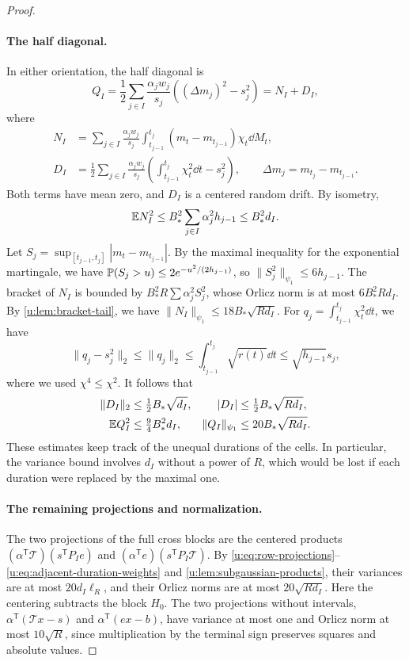\begin{proof}
\paragraph{The half diagonal.}
In either orientation, the half diagonal is
\begin{equation}\label{u:eq:half-diagonal}
 Q_I=\frac12\sum_{j\in I}\frac{\alpha_jw_j}{s_j}
       ((\Delta m_j)^2-s_j^2)=N_I+D_I,
\end{equation}
where
\[
\begin{aligned}
 N_I&=\sum_{j\in I}\frac{\alpha_jw_j}{s_j}
 \int_{t_{j-1}}^{t_j}(m_t-m_{t_{j-1}})\chi_t\dd M_t,\\
 D_I&=\frac12\sum_{j\in I}\frac{\alpha_jw_j}{s_j}
 \left(\int_{t_{j-1}}^{t_j}\chi_t^2\dd t-s_j^2\right),
 \qquad \Delta m_j=m_{t_j}-m_{t_{j-1}}.
\end{aligned}
\]
Both terms have mean zero, and $D_I$ is a centered random drift.
By isometry,
\[
 \mathbb E N_I^2\le B_*^2\sum_{j\in I}\alpha_j^2h_{j-1}
 \le B_*^2d_I.
\]
Let $S_j=\sup_{[t_{j-1},t_j]}|m_t-m_{t_{j-1}}|$. By the maximal
inequality for the exponential martingale, we have
$\mathbb P(S_j>u)\le2e^{-u^2/(2h_{j-1})}$, so
$\|S_j^2\|_{\psi_1}\le6h_{j-1}$. The bracket of $N_I$ is bounded
by $B_*^2R\sum\alpha_j^2S_j^2$, whose Orlicz norm is at most
$6B_*^2Rd_I$. By \cref{u:lem:bracket-tail}, we have
$\|N_I\|_{\psi_1}\le18B_*\sqrt{Rd_I}$.
For $q_j=\int_{t_{j-1}}^{t_j}\chi_t^2\dd t$, we have
\[
 \|q_j-s_j^2\|_2\le\|q_j\|_2
 \le\int_{t_{j-1}}^{t_j}\sqrt{r(t)}\dd t
 \le\sqrt{h_{j-1}}s_j,
\]
where we used $\chi^4\le\chi^2$. It follows that
\begin{equation}\label{u:eq:half-diagonal-bounds}
\begin{aligned}
 \|D_I\|_2&\le\tfrac12B_*\sqrt{d_I},
 &|D_I|&\le\tfrac12B_*\sqrt{Rd_I},\\
 \mathbb E Q_I^2&\le\tfrac94B_*^2d_I,
 &\|Q_I\|_{\psi_1}&\le20B_*\sqrt{Rd_I}.
\end{aligned}
\end{equation}
These estimates keep track of the unequal durations of the cells. In
particular, the variance bound involves $d_I$ without a power of $R$,
which would be lost if each duration were replaced by the maximal one.

\paragraph{The remaining projections and normalization.}
The two projections of the full cross blocks are the centered products
$(\alpha^{\mathsf T}\mathcal T)(s^{\mathsf T}P_Ie)$ and
$(\alpha^{\mathsf T}e)(s^{\mathsf T}P_I\mathcal T)$. By
\eqref{u:eq:row-projections}--\eqref{u:eq:adjacent-duration-weights}
and \cref{u:lem:subgaussian-products}, their variances are at most
$20d_I\ell_R$, and their Orlicz norms are at most $20\sqrt{Rd_I}$.
Here the centering subtracts the block $H_0$.
The two projections without intervals,
$\alpha^{\mathsf T}(\mathcal T x-s)$ and
$\alpha^{\mathsf T}(ex-b)$, have variance at most one and Orlicz
norm at most $10\sqrt R$, since multiplication by the terminal sign
preserves squares and absolute values.


\end{proof}
